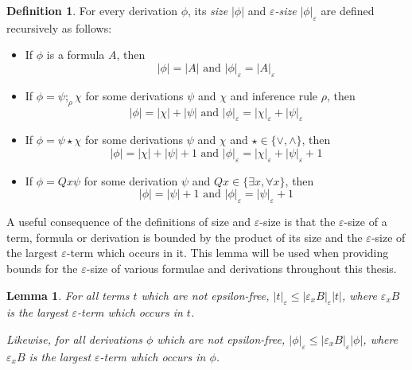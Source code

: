 \documentclass[10pt]{article}
\newtheorem{lemma}[theorem]{Lemma}
\theoremstyle{definition}\newtheorem{remark}[theorem]{Remark}
\theoremstyle{definition}\newtheorem{example}[theorem]{Example}
\theoremstyle{definition}\newtheorem{definition}[theorem]{Definition}
\newcommand{\compByInf}[1]{;_{#1}}
\begin{document}
	\begin{definition}
		For every derivation $\phi$, its \textit{size} $| \phi |$ and \textit{$\varepsilon$-size} $| \phi |_\varepsilon$ are defined recursively as follows:
		
		\begin{itemize}
			\item If $\phi$ is a formula $A$, then
			\[
				| \phi | = | A | \text{ and } | \phi |_\varepsilon = | A |_\varepsilon
			\]
			
			\item If $\phi = \psi \compByInf{\rho} \chi$ for some derivations $\psi$ and $\chi$ and inference rule $\rho$, then
			\[
				| \phi | = | \chi | + | \psi | \text{ and } | \phi |_\varepsilon = | \chi |_\varepsilon + | \psi |_\varepsilon
			\]
			
			\item If $\phi = \psi \star \chi$ for some derivations $\psi$ and $\chi$ and $\star \in \{\lor, \land\}$, then
			\[
				| \phi | = | \chi | + | \psi | + 1 \text{ and } | \phi |_\varepsilon = | \chi |_\varepsilon + | \psi |_\varepsilon + 1
			\]
			
			\item If $\phi = Qx \psi$ for some derivation $\psi$ and $Qx \in \{\exists x, \forall x\}$, then
			\[
				| \phi | = | \psi | + 1 \text{ and } | \phi |_\varepsilon = | \psi |_\varepsilon + 1
			\]
		\end{itemize}
	\end{definition}

	A useful consequence of the definitions of size and $\varepsilon$-size is that the $\varepsilon$-size of a term, formula or derivation is bounded by the product of its size and the $\varepsilon$-size of the largest $\varepsilon$-term which occurs in it. This lemma will be used when providing bounds for the $\varepsilon$-size of various formulae and derivations throughout this thesis.

	\begin{lemma}\label{EpsilonProductSizeLemma}
		For all terms $t$ which are not epsilon-free, $|t|_\varepsilon \leq |\varepsilon_x B|_\varepsilon |t|$, where $\varepsilon_x B$ is the largest $\varepsilon$-term which occurs in $t$.
		
		Likewise, for all derivations $\phi$ which are not epsilon-free, $|\phi|_\varepsilon \leq |\varepsilon_x B|_\varepsilon |\phi|$, where $\varepsilon_x B$ is the largest $\varepsilon$-term which occurs in $\phi$.
	\end{lemma}
\end{document}
